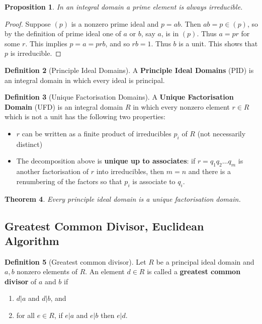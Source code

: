 \documentclass[10pt, oneside, reqno]{amsart}
\theoremstyle{plain}%
\newtheorem{thm}{Theorem}[section]
\newtheorem{prop}[thm]{Proposition}
\theoremstyle{definition}
\newtheorem{defn}[thm]{Definition}
\theoremstyle{remark}
\begin{document}
\begin{prop}
	In an integral domain a prime element is always irreducible.
\end{prop}
\begin{proof}
	Suppose $(p)$ is a nonzero prime ideal and $p = ab$.  Then $ab = p \in (p)$, so by the definition of prime ideal one of $a$ or $b$, say $a$, is in $(p)$.  Thus $a = pr$ for some $r$.  This implies $p = a = prb$, and so $rb = 1$.  Thus $b$ is a unit.  This shows that $p$ is irreducible.
\end{proof}

\begin{defn}[Principle Ideal Domains]
	A \textbf{Principle Ideal Domains} (PID) is an integral domain in which every ideal is principal. 
\end{defn}

\begin{defn}[Unique Factorisation Domains]
	A \textbf{Unique Factorisation Domain} (UFD) is an integral domain $R$ in which every nonzero element $r \in R$ which is not a unit has the following two properties:
	\begin{itemize}
		\item $r$ can be written as a finite product of irreducibles $p_i$ of $R$ (not necessarily distinct)
		\item The decomposition above is \textbf{unique up to associates}: if $r = q_1 q_2 \dots q_m$ is another factorisation of $r$ into irreducibles, then $m = n$ and there is a renumbering of the factors so that $p_i$ is associate to $q_i$. 
		\end{itemize}
\end{defn}

\begin{thm}
	Every principle ideal domain is a unique factorisation domain.
\end{thm}

\subsection{Greatest Common Divisor, Euclidean Algorithm} %
\label{sub:greatest_common_divisor_euclidean_algorithm}
\begin{defn}[Greatest common divisor]
	Let $R$ be a principal ideal domain and $a,b$ nonzero elements of $R$.  An element $d \in R$ is called a \textbf{greatest common divisor} of $a$ and $b$ if 
	\begin{enumerate}
		\item $d | a$ and $d|b$, and
		\item for all $e \in R$, if $e | a$ and $e | b$ then $e | d$.
	\end{enumerate}
\end{defn}
\end{document}
